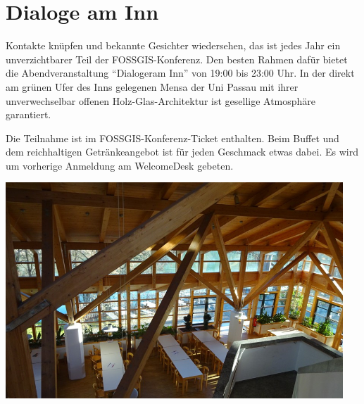 \newpage
\thispagestyle{cropmarksstyle}
\section*{Dialoge am Inn}
\label{social-event}
Kontakte knüpfen und bekannte Gesichter wiedersehen, das ist jedes Jahr ein unverzichtbarer Teil der
FOSSGIS-Konferenz. Den besten Rahmen dafür bietet die Abendveranstaltung "`Dialogeram Inn"' von 19:00
bis 23:00 Uhr. In der
direkt am grünen Ufer des Inns gelegenen Mensa der Uni Passau mit ihrer unverwechselbar offenen
Holz-Glas-Architektur ist gesellige Atmosphäre garantiert.

Die Teilnahme ist im
FOSSGIS-Konferenz-Ticket enthalten. Beim Buffet und dem reichhaltigen Getränkeangebot ist für jeden
Geschmack etwas dabei. Es wird um vorherige Anmeldung am WelcomeDesk gebeten.
\vfill
\begin{center}
  \noindent\includegraphics[width=0.95\textwidth]{images-print/mensa-innen.jpg}
\end{center}
\enlargethispage{0.5\baselineskip}
\newpage
